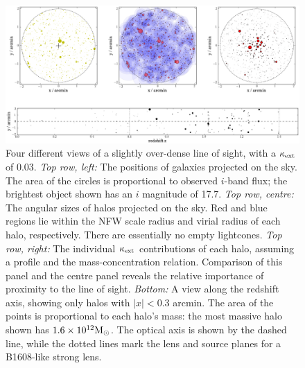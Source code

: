 \documentclass[useAMS,usenatbib]{mn2e}
\begin{document}
\begin{figure}
\includegraphics[width=\textwidth]{figs/viewofalightcone.eps}
\caption[magcut]{Four different views of a slightly over-dense \MS line
of sight, with a $\kappa_{\rm ext}$ of 0.03. 
{\it Top row, left:} The positions of galaxies projected on the sky. The area
of the circles is proportional to observed $i$-band flux; the brightest
object shown has an $i$ magnitude of 17.7. 
{\it Top row, centre:} The angular sizes of halos projected on the sky.
Red and blue regions lie within the NFW scale radius and virial radius
of each halo, respectively. There are essentially no empty lightcones. 
{\it Top row, right:} The individual $\kappa_{\rm ext}$ contributions of
each halo, assuming a \citet{BMO} profile and the \citet{Neto2007}
mass-concentration relation. Comparison of
this panel and the centre panel reveals the relative importance of
proximity to the line of sight.
{\it Bottom:} A view along the redshift axis, showing only halos with
$|x|<0.3$ arcmin. The area of the points is proportional to each halo's
mass: the most massive halo shown has $1.6\times10^{12}\Msun$. The
optical axis is shown by the dashed line, while the dotted lines mark
the lens and source planes for a B1608-like strong lens.}
\label{fig:lightcone}
\end{figure}



\end{document}
